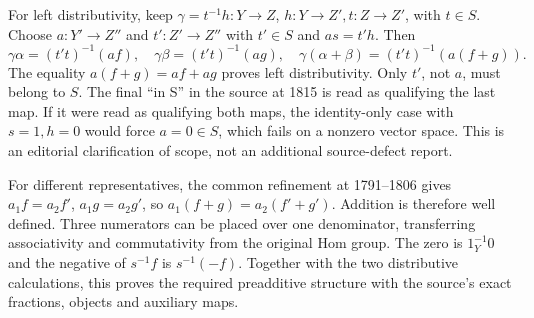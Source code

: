 For left distributivity, keep \(\gamma=t^{-1}h:Y\to Z\), \(h:Y\to Z',t:Z\to Z'\), with \(t\in S\). Choose \(a:Y'\to Z''\) and \(t':Z'\to Z''\) with \(t'\in S\) and \(as=t'h\). Then \[
\gamma\alpha=(t't)^{-1}(af),\quad
\gamma\beta=(t't)^{-1}(ag),\quad
\gamma(\alpha+\beta)=(t't)^{-1}(a(f+g)).
\] The equality \(a(f+g)=af+ag\) proves left distributivity. Only \(t'\), not \(a\), must belong to \(S\). The final ``in S'' in the source at 1815 is read as qualifying the last map. If it were read as qualifying both maps, the identity-only case with \(s=1,h=0\) would force \(a=0\in S\), which fails on a nonzero vector space. This is an editorial clarification of scope, not an additional source-defect report.

For different representatives, the common refinement at 1791--1806 gives \(a_1f=a_2f'\), \(a_1g=a_2g'\), so \(a_1(f+g)=a_2(f'+g')\). Addition is therefore well defined. Three numerators can be placed over one denominator, transferring associativity and commutativity from the original Hom group. The zero is \(1_Y^{-1}0\) and the negative of \(s^{-1}f\) is \(s^{-1}(-f)\). Together with the two distributive calculations, this proves the required preadditive structure with the source's exact fractions, objects and auxiliary maps.
